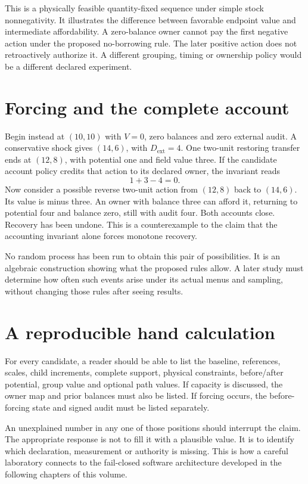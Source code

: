 This is a physically feasible quantity-fixed sequence under simple stock
nonnegativity. It illustrates the difference between favorable endpoint
value and intermediate affordability. A zero-balance owner cannot pay the
first negative action under the proposed no-borrowing rule. The later
positive action does not retroactively authorize it. A different grouping,
timing or ownership policy would be a different declared experiment.

\section{Forcing and the complete account}
Begin instead at $(10,10)$ with $V=0$, zero balances and zero external
audit. A conservative shock gives $(14,6)$, with $D_{\mathrm{ext}}=4$.
One two-unit restoring transfer ends at $(12,8)$, with potential one and
field value three. If the candidate account policy credits that action
to its declared owner, the invariant reads
\begin{equation}
 1+3-4=0.
\end{equation}
Now consider a possible reverse two-unit action from $(12,8)$ back to
$(14,6)$. Its value is minus three. An owner with balance three can afford
it, returning to potential four and balance zero, still with audit four.
Both accounts close. Recovery has been undone. This is a counterexample
to the claim that the accounting invariant alone forces monotone recovery.

No random process has been run to obtain this pair of possibilities. It is
an algebraic construction showing what the proposed rules allow. A later
study must determine how often such events arise under its actual menus and
sampling, without changing those rules after seeing results.

\section{A reproducible hand calculation}
For every candidate, a reader should be able to list the baseline, references,
scales, child increments, complete support, physical constraints, before/after
potential, group value and optional path values. If capacity is discussed,
the owner map and prior balances must also be listed. If forcing occurs,
the before-forcing state and signed audit must be listed separately.

An unexplained number in any one of those positions should interrupt the
claim. The appropriate response is not to fill it with a plausible value.
It is to identify which declaration, measurement or authority is missing.
This is how a careful laboratory connects to the fail-closed software
architecture developed in the following chapters of this volume.

